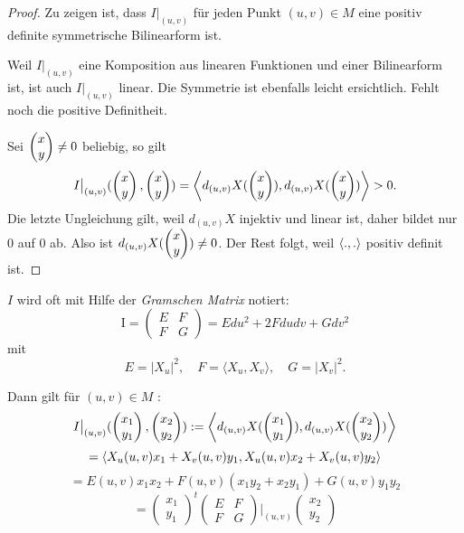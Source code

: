 \begin{proof}
	Zu zeigen ist, dass $I\big| _{(u,v)}$ für jeden Punkt $(u,v)\in M$ eine positiv definite symmetrische Bilinearform ist. 
	
	Weil $ I\big| _{(u,v)} $ eine Komposition aus linearen Funktionen und einer Bilinearform ist, ist auch $I\big| _{(u,v)}$ linear. Die Symmetrie ist ebenfalls leicht ersichtlich. Fehlt noch die positive Definitheit.
	
	Sei $\begin{pmatrix} x\\y \end{pmatrix} \neq 0$ beliebig, so gilt
		\[ I\big| _{(u,v)}(\begin{pmatrix} x\\y \end{pmatrix},\begin{pmatrix} x\\y \end{pmatrix})
			= \left \langle d_{(u,v)}X(\begin{pmatrix} x\\y \end{pmatrix}),d_{(u,v)}X(\begin{pmatrix} x\\y \end{pmatrix}) \right\rangle> 0. \]
	Die letzte Ungleichung gilt, weil $d_{(u,v)}X$ injektiv und linear ist, daher bildet nur $0$ auf $0$ ab. Also ist $d_{(u,v)}X(\begin{pmatrix} x\\y \end{pmatrix})\neq 0$. Der Rest folgt, weil $\left \langle .,. \right\rangle$ positiv definit ist.
\end{proof}

\begin{remark}
	
	$I$ wird oft mit Hilfe der \emph{Gramschen Matrix} notiert: \[ \mathrm{I} = \begin{pmatrix}
	E & F\\
	F & G
	\end{pmatrix} = E du^2 + 2Fdudv + Gdv^2 \] mit
	\[ E=|X_u|^2,\quad F = \langle X_u,X_v \rangle,\quad G = |X_v|^2.  \]
	


Dann gilt für $ (u,v) \in M$ : \[ I \big|_{(u,v)}(\begin{pmatrix}
x_1 \\
y_1
\end{pmatrix},\begin{pmatrix}
x_2 \\
y_2
\end{pmatrix}) := \left \langle  d_{(u,v)}X(\begin{pmatrix}
x_1 \\
y_1
\end{pmatrix}),  d_{(u,v)}X(\begin{pmatrix}
x_2 \\
y_2
\end{pmatrix})  \right\rangle \] \[= \left \langle  X_u(u,v)x_1 + X_v(u,v)y_1, X_u(u,v)x_2 + X_v(u,v)y_2  \right\rangle \]
\[ = E(u,v)x_1x_2 + F(u,v)(x_1y_2 + x_2y_1) + G(u,v)y_1y_2 \]
\[ = \begin{pmatrix}
x_1 \\
y_1
\end{pmatrix}^t \begin{pmatrix}
E & F \\ 
F & G
\end{pmatrix}\Bigg|_{(u,v)} \begin{pmatrix}
x_2\\
y_2
\end{pmatrix} \]

\end{remark}


